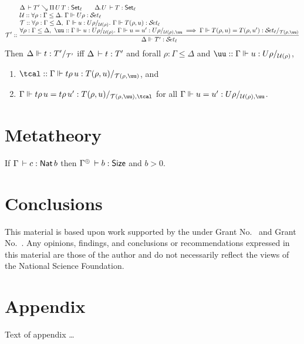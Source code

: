 \documentclass[acmlarge,review,anonymous]{acmart}\settopmatter{printfolios=true}
\begin{document}
\begin{caselist}
\nextcase
\[
  \T' ::
  \rul{\Delta \der T' \evalsto \piT U T : \Set[\ell] \qquad \cext \Delta U \der T : \Set[\ell] \\ \relax
      \U :: \forall \rho : \Gamma \leq \Delta.~ \sty{\Gamma}{U\rho} {\ell} \\ \relax
      \T :: \forall \rho : \Gamma \leq \Delta,~\sttmd \Gamma u {U\rho} {\U(\rho)}.~
        \sty \Gamma {T(\rho,u)} \ell \\
      \forall \rho : \Gamma \leq \Delta,~ \uu :: \sttmd \Gamma u {U\rho} {\U(\rho)}.~
        \sttmeqd \Gamma u {u'} {U\rho} {\U(\rho)} {\uu} \implies
        \steqd \Gamma {T(\rho,u)} {T(\rho,u')} \ell {\T(\rho,\uu)}
    }{\sty \Delta {T'} \ell}
\]
Then $\Delta \Vdash t : T' /_{\mathcal{T}'}$ iff $\Delta \,\vdash t : T'$ and
forall $\rho : \Gamma \leq \Delta$ and $\uu :: \sttmd \Gamma u {U\rho} {\U(\rho)}$,
\begin{enumerate}
\item $\tcal :: \sttmd \Gamma {t\rho\,u} {T(\rho,u)} {\T(\rho,\uu)}$, and
\item $\sttmeqd \Gamma {t\rho\,u} {t\rho\,u'} {T(\rho,u)} {\T(\rho,\uu)} {\tcal}$ for all
  $\sttmeqd \Gamma u {u'} {U\rho} {\U(\rho)} {\uu}$.
\end{enumerate}


\end{caselist}

\newpage

\section{Metatheory}
\label{sec:meta}


\begin{lemma}
\label{lem:invdata} \bla
If\/ $\Gamma \,\vdash c : \mathsf{Nat}\, b$ then $\resurrect\Gamma \der b : \Size$ and $b > 0$.
\end{lemma}


\section{Conclusions}
\label{sec:concl}

\begin{acks}                            %
  This material is based upon work supported by the
   under Grant
  No.~ and Grant
  No.~.  Any opinions, findings, and
  conclusions or recommendations expressed in this material are those
  of the author and do not necessarily reflect the views of the
  National Science Foundation.
\end{acks}





\appendix
\section{Appendix}

Text of appendix \ldots
\end{document}
